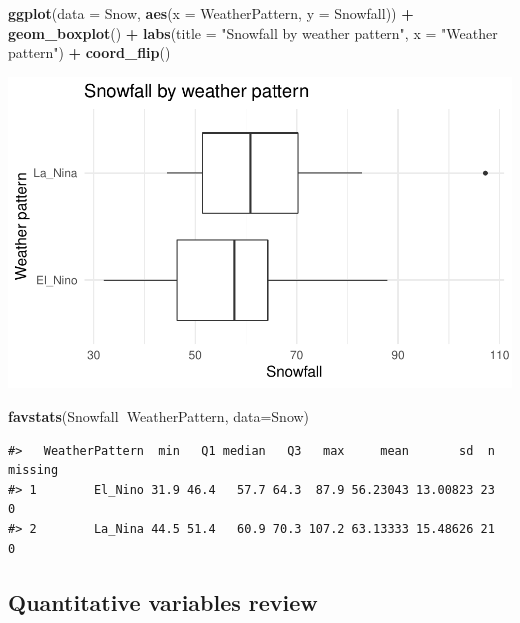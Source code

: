 \documentclass[
]{report}
\newenvironment{Shaded}{\begin{snugshade}}{\end{snugshade}}
\newcommand{\DataTypeTok}[1]{\textcolor[rgb]{0.13,0.29,0.53}{#1}}
\newcommand{\KeywordTok}[1]{\textcolor[rgb]{0.13,0.29,0.53}{\textbf{#1}}}
\newcommand{\NormalTok}[1]{#1}
\newcommand{\OperatorTok}[1]{\textcolor[rgb]{0.81,0.36,0.00}{\textbf{#1}}}
\newcommand{\StringTok}[1]{\textcolor[rgb]{0.31,0.60,0.02}{#1}}
\begin{document}
\begin{Shaded}
\begin{Highlighting}[]
\KeywordTok{ggplot}\NormalTok{(}\DataTypeTok{data =}\NormalTok{ Snow,}
       \KeywordTok{aes}\NormalTok{(}\DataTypeTok{x =}\NormalTok{ WeatherPattern, }\DataTypeTok{y =}\NormalTok{ Snowfall)) }\OperatorTok{+}
\StringTok{    }\KeywordTok{geom_boxplot}\NormalTok{() }\OperatorTok{+}\StringTok{ }
\StringTok{    }\KeywordTok{labs}\NormalTok{(}\DataTypeTok{title =} \StringTok{"Snowfall by weather pattern"}\NormalTok{,}
         \DataTypeTok{x =} \StringTok{"Weather pattern"}\NormalTok{) }\OperatorTok{+}
\StringTok{    }\KeywordTok{coord_flip}\NormalTok{()}
\end{Highlighting}
\end{Shaded}

\begin{center}\includegraphics[width=0.6\linewidth]{09-inference-2quant_files/figure-latex/unnamed-chunk-2-1} \end{center}

\begin{Shaded}
\begin{Highlighting}[]
\KeywordTok{favstats}\NormalTok{(Snowfall}\OperatorTok{~}\NormalTok{WeatherPattern, }\DataTypeTok{data=}\NormalTok{Snow)}
\end{Highlighting}
\end{Shaded}

\begin{verbatim}
#>   WeatherPattern  min   Q1 median   Q3   max     mean       sd  n missing
#> 1        El_Nino 31.9 46.4   57.7 64.3  87.9 56.23043 13.00823 23       0
#> 2        La_Nina 44.5 51.4   60.9 70.3 107.2 63.13333 15.48626 21       0
\end{verbatim}

\hypertarget{quantitative-variables-review}{%
\subsection{Quantitative variables review}\label{quantitative-variables-review}}
\end{document}
